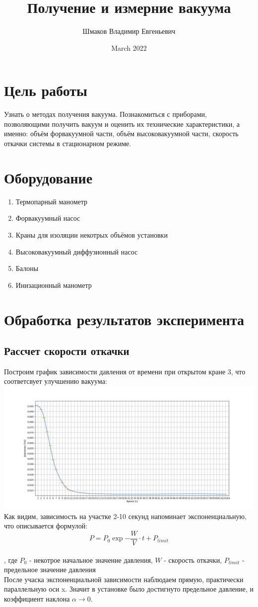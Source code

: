 \documentclass{article}
\author{Шмаков Владимир Евгеньевич}
\date{March 2022}
\title{Получение и измерние вакуума}
\begin{document}
\maketitle
\newpage

\section{Цель работы}
Узнать о методах получения вакуума. Познакомиться с приборами, позволяющими получить вакуум и оценить их
технические характеристики, а именно: объём форвакуумной части, объём высоковакуумной части, скорость откачки системы в стационарном режиме.
\section{Оборудование}
\begin{enumerate}
\item Термопарный манометр
\item Форвакуумный насос 
\item Краны для изоляции некотрых объёмов установки 
\item Высоковакуумный диффузионный насос 
\item Балоны 
\item Инизационный манометр
\end{enumerate}
\section{Обработка результатов эксперимента}
\subsection{Рассчет скорости откачки}
Построим график зависимости давления от времени при открытом кране 3, что соответсвует улучшению вакуума: \\
\includegraphics[scale = 0.3]{pressurebyTime.png} \\
Как видим, зависимость на участке 2-10 секунд напоминает экспоненциальную, что описывается формулой: 
\begin{equation}\label{PbyTime}
P = P_{0}\exp{-\frac{W}{V}\cdot t}+P_{limit}
\end{equation}
\\
, где $P_{0}$ - некотрое начальное значение давления, $W$ - скорость откачки, $P_{limit}$ - предельное значение давления
\\
После учаска экспоненциальной зависимости наблюдаем прямую, практически параллельную оси x. Значит в установке было достигнуто предельное давление, и коэффициент наклона $\alpha \xrightarrow[]{} 0$.
\end{document}
